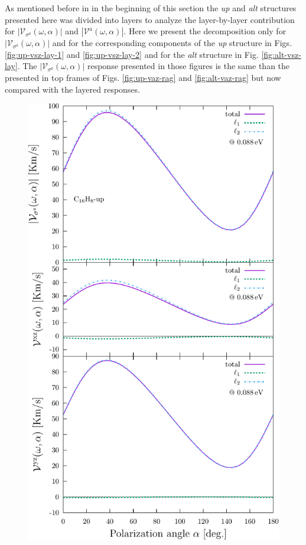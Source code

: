 \documentclass[prb,11pt,tightenlines,twocolumn,aps]{revtex4-1}
\begin{document}
{\color{blue} As mentioned before in in the beginning of this section the
\emph{up} and \emph{alt} structures presented here was divided into layers to
analyze the layer-by-layer contribution for
$|\mathcal{V}_{\sigma^{\mathrm{z}}}(\omega,\alpha)|$ and
$|\mathcal{V}^{\mathrm{a}}(\omega,\alpha)|$. Here we present the decomposition
only for $|\mathcal{V}_{\sigma^{\mathrm{z}}}(\omega,\alpha)|$ and for the
corresponding components of the \emph{up} structure in Figs. 
% 
\ref{fig:up-vsz-lay-1} and \ref{fig:up-vsz-lay-2} and for the \emph{alt}
structure in Fig. \ref{fig:alt-vsz-lay}. The
$|\mathcal{V}_{\sigma^{\mathrm{z}}}(\omega,\alpha)|$ response presented in those
figures is the same than the presented in top frames of Figs. 
% 
\ref{fig:up-vaz-rag} and \ref{fig:alt-vaz-rag} but now compared with the layered
responses.
% 
}
% 
\begin{figure}[t]
    \centering
    \includegraphics[width=\linewidth]{upplots/up-svaz-lay-1}
    

\end{figure}
\end{document}
